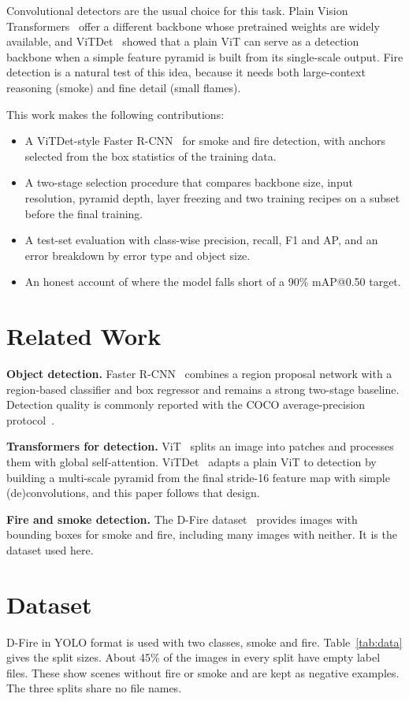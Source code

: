 \documentclass[conference]{IEEEtran}
\begin{document}
Convolutional detectors are the usual choice for this task. Plain Vision Transformers~\cite{dosovitskiy2021vit} offer a different backbone whose pretrained weights are widely available, and ViTDet~\cite{li2022vitdet} showed that a plain ViT can serve as a detection backbone when a simple feature pyramid is built from its single-scale output. Fire detection is a natural test of this idea, because it needs both large-context reasoning (smoke) and fine detail (small flames).

This work makes the following contributions:
\begin{itemize}
\item A ViTDet-style Faster R-CNN~\cite{ren2015faster} for smoke and fire detection, with anchors selected from the box statistics of the training data.
\item A two-stage selection procedure that compares backbone size, input resolution, pyramid depth, layer freezing and two training recipes on a subset before the final training.
\item A test-set evaluation with class-wise precision, recall, F1 and AP, and an error breakdown by error type and object size.
\item An honest account of where the model falls short of a 90\% mAP@0.50 target.
\end{itemize}

\section{Related Work}
\textbf{Object detection.} Faster R-CNN~\cite{ren2015faster} combines a region proposal network with a region-based classifier and box regressor and remains a strong two-stage baseline. Detection quality is commonly reported with the COCO average-precision protocol~\cite{lin2014coco}.

\textbf{Transformers for detection.} ViT~\cite{dosovitskiy2021vit} splits an image into patches and processes them with global self-attention. ViTDet~\cite{li2022vitdet} adapts a plain ViT to detection by building a multi-scale pyramid from the final stride-16 feature map with simple (de)convolutions, and this paper follows that design.

\textbf{Fire and smoke detection.} The D-Fire dataset~\cite{venancio2022dfire} provides images with bounding boxes for smoke and fire, including many images with neither. It is the dataset used here.

\section{Dataset}
D-Fire in YOLO format is used with two classes, smoke and fire. Table~\ref{tab:data} gives the split sizes. About 45\% of the images in every split have empty label files. These show scenes without fire or smoke and are kept as negative examples. The three splits share no file names.
\end{document}
